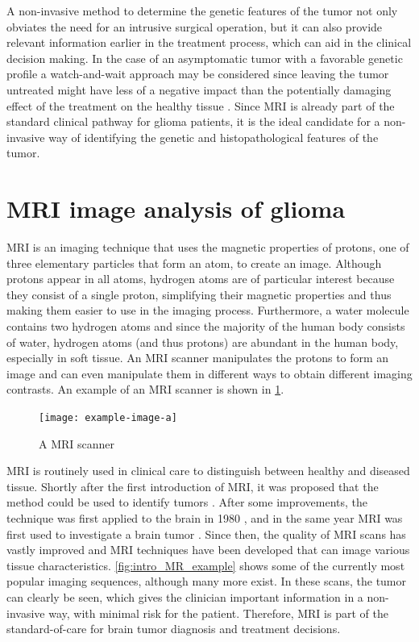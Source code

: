 A non-invasive method to determine the genetic features of the \gls{tumor} not only obviates the need for an intrusive surgical operation, but it can also provide relevant information earlier in the treatment process, which can aid in the clinical decision making.
In the case of an asymptomatic \gls{tumor} with a favorable genetic profile a watch-and-wait approach may be considered since leaving the \gls{tumor} untreated might have less of a negative impact than the potentially damaging effect of the treatment on the healthy tissue \autocite{vandenbent2012lggtreatment, welle2017EANO}.
Since \gls{MRI} is already part of the standard clinical pathway for glioma patients, it is the ideal candidate for a non-invasive way of identifying the genetic and histopathological features of the \gls{tumor}.

\section{MRI image analysis of glioma}

\acrfull{MRI} is an imaging technique that uses the magnetic properties of protons, one of three elementary particles that form an atom, to create an image.
Although protons appear in all atoms, hydrogen atoms are of particular interest because they consist of a single proton, simplifying their magnetic properties and thus making them easier to use in the imaging process.
Furthermore, a water molecule contains two hydrogen atoms and since the majority of the human body consists of water, hydrogen atoms (and thus protons) are abundant in the human body, especially in soft tissue.
An \gls{MRI} scanner manipulates the protons to form an image and can even manipulate them in different ways to obtain different imaging contrasts.
An example of an \gls{MRI} scanner is shown in \cref{fig:intro_MR_machine}.


\begin{figure}[hbt]
    \texttt{[image: example-image-a]}
    \caption{A \acrfull{MRI} scanner}\label{fig:intro_MR_machine}
\end{figure}

\gls{MRI} is routinely used in clinical care to distinguish between healthy and diseased tissue.
Shortly after the first introduction of \gls{MRI}, it was proposed that the method could be used to identify \glspl{tumor} \autocite{damadian1971tumor}.
After some improvements, the technique was first applied to the brain in 1980 \autocite{holland1980brain}, and in the same year MRI was first used to investigate a brain \gls{tumor} \autocite{hawkes1980NMRbrain}.
Since then, the quality of \gls{MRI} scans has vastly improved and \gls{MRI} techniques have been developed that can image various tissue characteristics.
\cref{fig:intro_MR_example} shows some of the currently most popular imaging sequences, although many more exist.
In these scans, the \gls{tumor} can clearly be seen, which gives the clinician important information in a non-invasive way, with minimal risk for the patient.
Therefore, \gls{MRI} is part of the standard-of-care for brain \gls{tumor} diagnosis and treatment decisions.

